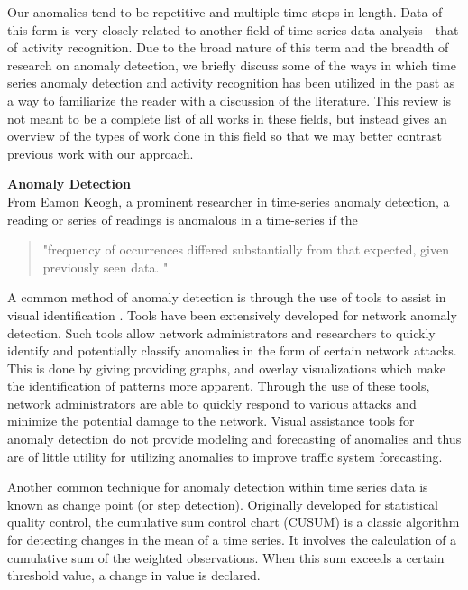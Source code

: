 Our anomalies tend to be repetitive and multiple time steps in length.  Data of this form is very closely related to another field of time series data analysis - that of activity recognition.   Due to the broad nature of this term and the breadth of research on anomaly detection, we briefly discuss some of the ways in which time series anomaly detection and activity recognition has been utilized in the past as a way to familiarize the reader with a discussion of the literature.  This review is not meant to be a complete list of all works in these fields, but instead gives an overview of the types of work done in this field so that we may better contrast previous work with our approach.

\bigskip
\noindent \textbf{Anomaly Detection} \\
From Eamon Keogh, a prominent researcher in time-series anomaly detection, a reading or series of readings is anomalous in a time-series if the 

\begin{quote}
"frequency of occurrences differed substantially from that expected, given previously seen data. \cite{Keogh2002}"
\end{quote}

A common method of anomaly detection is through the use of tools to assist in visual identification \cite{Stoffel2013, Lakhina2004, Shi2012}.  Tools have been extensively developed for network anomaly detection.  Such tools allow network administrators and researchers to quickly identify and potentially classify anomalies in the form of certain network attacks.  This is done by giving providing graphs, and overlay visualizations which make the identification of patterns more apparent.  Through the use of these tools, network administrators are able to quickly respond to  various attacks and minimize the potential damage to the network.  Visual assistance tools for anomaly detection do not provide modeling and forecasting of anomalies and thus are of little utility for utilizing anomalies to improve traffic system forecasting.   

Another common technique for anomaly detection within time series data is known as change point (or step detection).  Originally developed for statistical quality control, the cumulative sum control chart (CUSUM) \cite{page1955} is a classic algorithm for detecting changes in the mean of a time series.  It involves the calculation of a cumulative sum of the weighted observations.  When this sum exceeds a certain threshold value, a change in value is declared. 

